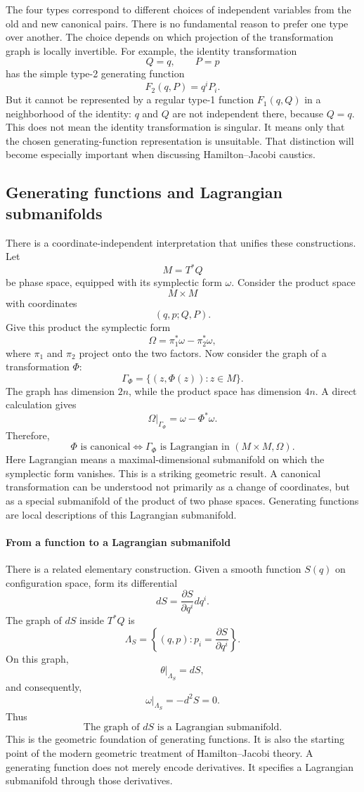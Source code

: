The four types correspond to different choices of independent variables from
the old and new canonical pairs.
There is no fundamental reason to prefer one type over another. The choice
depends on which projection of the transformation graph is locally invertible.
For example, the identity transformation
\[
Q=q,\qquad P=p
\]
has the simple type-2 generating function
\[
\boxed{F_2(q,P)=q^iP_i.}
\]
But it cannot be represented by a regular type-1 function \(F_1(q,Q)\) in a
neighborhood of the identity: \(q\) and \(Q\) are not independent there,
because \(Q=q\).
This does not mean the identity transformation is singular.
It means only that the chosen generating-function representation is unsuitable.
That distinction will become especially important when discussing
Hamilton–Jacobi caustics.

\subsection{Generating functions and Lagrangian submanifolds}
There is a coordinate-independent interpretation that unifies these
constructions.
Let
\[
M=T^*Q
\]
be phase space, equipped with its symplectic form \(\omega\).
Consider the product space
\[
M\times M
\]
with coordinates
\[
(q,p;Q,P).
\]
Give this product the symplectic form
\[
\boxed{
\Omega=\pi_1^*\omega-\pi_2^*\omega,
}
\]
where \(\pi_1\) and \(\pi_2\) project onto the two factors.
Now consider the graph of a transformation \(\Phi\):
\[
\Gamma_\Phi=
\{(z,\Phi(z)):z\in M\}.
\]
The graph has dimension \(2n\), while the product space has dimension \(4n\).
A direct calculation gives
\[
\left.\Omega\right|_{\Gamma_\Phi}
=\omega-\Phi^*\omega.
\]
Therefore,
\[
\boxed{
\Phi\text{ is canonical}
\iff
\Gamma_\Phi\text{ is Lagrangian in }(M\times M,\Omega).
}
\]
Here Lagrangian means a maximal-dimensional submanifold on which the symplectic
form vanishes.
This is a striking geometric result.
A canonical transformation can be understood not primarily as a change of
coordinates, but as a special submanifold of the product of two phase spaces.
Generating functions are local descriptions of this Lagrangian submanifold.

\paragraph{From a function to a Lagrangian submanifold}
There is a related elementary construction.
Given a smooth function \(S(q)\) on configuration space, form its differential
\[
dS=\frac{\partial S}{\partial q^i}dq^i.
\]
The graph of \(dS\) inside \(T^*Q\) is
\[
\Lambda_S=
\left\{
(q,p):
p_i=\frac{\partial S}{\partial q^i}
\right\}.
\]
On this graph,
\[
\theta|_{\Lambda_S}=dS,
\]
and consequently,
\[
\omega|_{\Lambda_S}=-d^2S=0.
\]
Thus
\[
\boxed{
\text{The graph of }dS\text{ is a Lagrangian submanifold.}
}
\]
This is the geometric foundation of generating functions.
It is also the starting point of the modern geometric treatment of
Hamilton–Jacobi theory.
A generating function does not merely encode derivatives. It specifies a
Lagrangian submanifold through those derivatives.

